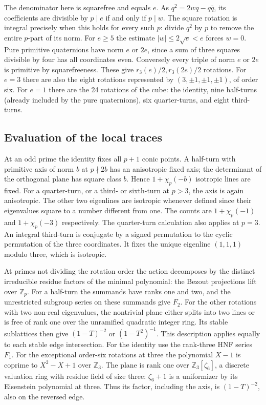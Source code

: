 The denominator here is squarefree and equals $e$.
As $q^2=2wq-q\bar q$, its coefficients are divisible by $p\mid e$
if and only if $p\mid w$. The square rotation is integral precisely
when this holds for every such $p$: divide $q^2$ by $p$ to remove the
entire $p$-part of its norm. For $e\ge5$ the estimate
$|w|\le2\sqrt e<e$ forces $w=0$. Pure primitive quaternions have
norm $e$ or $2e$, since a sum of three squares divisible by four
has all coordinates even. Conversely every triple of norm $e$ or
$2e$ is primitive by squarefreeness. These give $r_3(e)/2,r_3(2e)/2$
rotations. For $e=3$ there are also the eight rotations represented
by $(3,\pm1,\pm1,\pm1)$, of order six. For $e=1$ there are the 24
rotations of the cube: the identity, nine half-turns (already included
by the pure quaternions), six quarter-turns, and eight third-turns.

\subsection*{Evaluation of the local traces}
At an odd prime the identity fixes all $p+1$ conic points. A half-turn
with primitive axis of norm $b$ at $p\nmid 2b$ has an anisotropic
fixed axis; the determinant of the orthogonal plane has square class
$b$. Hence $1+\chi_p(-b)$ isotropic lines are fixed. For a quarter-turn,
or a third- or sixth-turn at $p>3$, the axis is again anisotropic.
The other two eigenlines are isotropic whenever defined since their
eigenvalues square to a number different from one. The counts are
$1+\chi_p(-1)$ and $1+\chi_p(-3)$ respectively. The quarter-turn calculation also applies at $p=3$. An integral third-turn is conjugate by a signed permutation
to the cyclic permutation of the three coordinates. It fixes the unique eigenline $(1,1,1)$ modulo three,
which is isotropic.

At primes not dividing the rotation order the action decomposes by
the distinct irreducible residue factors of the minimal polynomial:
the Bezout projections lift over $\mathbb Z_p$. For a half-turn the
summands have ranks one and two, and the unrestricted subgroup series
on these summands give $F_2$. For the other rotations with two non-real
eigenvalues, the nontrivial plane either splits into two lines or is
free of rank one over the unramified quadratic integer ring. Its stable
sublattices then give $(1-T)^{-2}$ or $(1-T^2)^{-1}$. This description
applies equally to each stable edge intersection. For the identity use the
rank-three HNF series $F_1$. For the exceptional order-six rotations at
three the polynomial $X-1$ is coprime to $X^2-X+1$ over $\mathbb Z_3$.
The plane is rank one over $\mathbb Z_3[\zeta_6]$, a discrete valuation
ring with residue field of size three: $\zeta_6+1$ is a uniformizer
by its Eisenstein polynomial at three. Thus its factor, including the
axis, is $(1-T)^{-2}$, also on the reversed edge.

